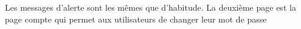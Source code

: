 \documentclass{article}
\begin{document}
\begin{enumerate}
   
   
   \vspace{0.7cm}
               \hspace*{-0.7in}
               \noindent{}                
               
               
               
               
               
               Les messages d'alerte sont les mêmes que d'habitude. La deuxième page est la page compte qui permet aux utilisateurs de changer leur mot de passe
  
  \vspace{0.7cm}
   
\hspace*{-0.7in}
               \noindent{}  
               

\end{enumerate}
\end{document}
